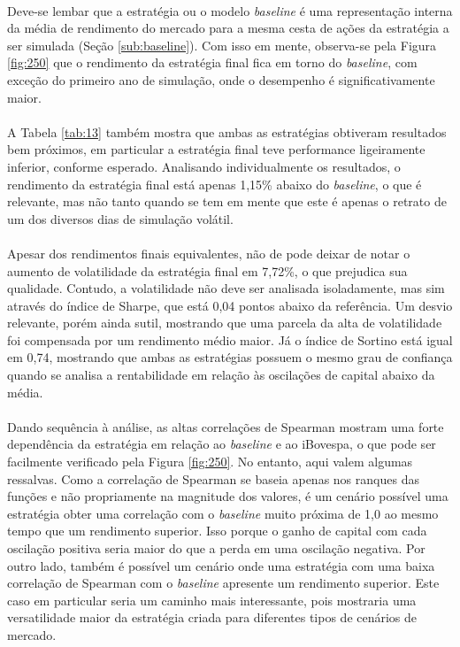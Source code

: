 \paragraph{} Deve-se lembar que a estratégia ou o modelo \textit{baseline} é uma representação interna da média de rendimento do mercado para a mesma cesta de ações da estratégia a ser simulada (Seção \ref{sub:baseline}). Com isso em mente, observa-se pela Figura \ref{fig:250} que o rendimento da estratégia final fica em torno do \textit{baseline}, com exceção do primeiro ano de simulação, onde o desempenho é significativamente maior.

\paragraph{} A Tabela \ref{tab:13} também mostra que ambas as estratégias obtiveram resultados bem próximos, em particular a estratégia final teve performance ligeiramente inferior, conforme esperado. Analisando individualmente os resultados, o rendimento da estratégia final está apenas 1,15\% abaixo do \textit{baseline}, o que é relevante, mas não tanto quando se tem em mente que este é apenas o retrato de um dos diversos dias de simulação volátil.

\paragraph{} Apesar dos rendimentos finais equivalentes, não de pode deixar de notar o aumento de volatilidade da estratégia final em 7,72\%, o que prejudica sua qualidade. Contudo, a volatilidade não deve ser analisada isoladamente, mas sim através do índice de Sharpe, que está 0,04 pontos abaixo da referência. Um desvio relevante, porém ainda sutil, mostrando que uma parcela da alta de volatilidade foi compensada por um rendimento médio maior. Já o índice de Sortino está igual em 0,74, mostrando que ambas as estratégias possuem o mesmo grau de confiança quando se analisa a rentabilidade em relação às oscilações de capital abaixo da média.

\paragraph{} Dando sequência à análise, as altas correlações de Spearman mostram uma forte dependência da estratégia em relação ao \textit{baseline} e ao iBovespa, o que pode ser facilmente verificado pela Figura \ref{fig:250}. No entanto, aqui valem algumas ressalvas. Como a correlação de Spearman se baseia apenas nos ranques das funções e não propriamente na magnitude dos valores, é um cenário possível uma estratégia obter uma correlação com o \textit{baseline} muito próxima de 1,0 ao mesmo tempo que um rendimento superior. Isso porque o ganho de capital com cada oscilação positiva seria maior do que a perda em uma oscilação negativa. Por outro lado, também é possível um cenário onde uma estratégia com uma baixa correlação de Spearman com o \textit{baseline} apresente um rendimento superior. Este caso em particular seria um caminho mais interessante, pois mostraria uma versatilidade maior da estratégia criada para diferentes tipos de cenários de mercado.

